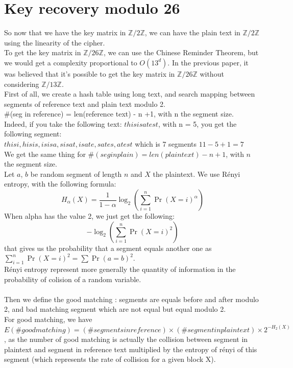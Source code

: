 \documentclass{article}
\begin{document}
\section{Key recovery modulo 26}
So now that we have the key matrix in $\mathbb{Z}/2\mathbb{Z}$, we can have the plain text in $\mathbb{Z}/2\mathbb{Z}$ using the linearity of the cipher.\\
To get the key matrix in $\mathbb{Z}/26\mathbb{Z}$, we can use the Chinese Reminder Theorem, but we would get a complexity proportional to $O(13^d)$. In the previous paper, it was believed that it's possible to get the key matrix in $\mathbb{Z}/26\mathbb{Z}$ without considering $\mathbb{Z}/13\mathbb{Z}$.\\
First of all, we create a hash table using long text, and search mapping between segments of reference text and plain text modulo 2.\\
\#(seg in reference) = len(reference text) - n +1, with n the segment size.\\
Indeed, if you take the following text: $thisisatest$, with n = 5, you get the following segment:\\
 $ thisi, hisis, isisa, sisat, isate, sates, atest $ which is 7 segments $ 11 - 5 + 1 = 7 $\\
We get the same thing for $\#(seg in plain) = len(plain text) - n +1$, with $n$ the segment size.\\
Let $a$, $b$ be random segment of length $n$ and $X$ the plaintext. We use R\'enyi entropy, with the following formula:\\
$$H_{\alpha}(X) = \frac{1}{1-\alpha}\log_{2}(\sum_{i=1}^{n}{\Pr(X=i)^{\alpha}})$$ 
When alpha has the value 2, we just get the following:
$$-\log_{2}(\sum_{i=1}^{n}{\Pr(X=i)^{2}})$$ that gives us the probability that a segment equals another one as $\sum_{i=1}^{n}{\Pr(X=i)^{2}} = \sum{\Pr(a=b)^{2}}$.\\
R\'enyi entropy represent more generally the quantity of information in the probability of colision of a random variable.\\
\\
Then we define the good matching : segments are equals before and after modulo 2, and bad matching segment which are not equal but equal modulo 2.\\
${}$\hspace{1em}For good matching, we have $E(\# good matching) = (\# segments in reference) \times (\#segment in plaintext) \times 2^{-H_{2}(X)}$, as the number of good matching is actually the collision between segment in plaintext and segment in reference text multiplied by the entropy of r\'enyi of this segment (which represents the rate of collision for a given block X).\\
\end{document}
